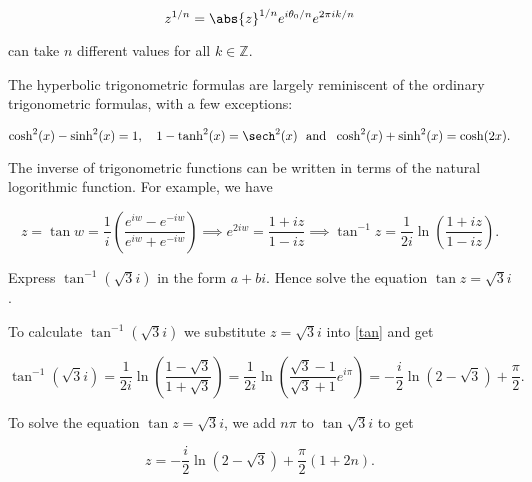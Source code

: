 \documentclass[english,a4paper,12pt]{report}
\begin{document}
\begin{equation}
    z^{1/n} = \abs{z}^{1/n} e^{i \theta _{0}/n } e^{2\pi i k /n}      
\end{equation}

can take \(n\) different values for all \(k \in \mathbb{Z}\). 

The hyperbolic trigonometric formulas are largely reminiscent of the ordinary trigonometric formulas, with a few exceptions:

\begin{equation}
    \cosh^2(x) - \sinh^2(x) = 1, \quad 1 - \tanh^2(x) = \sech^2(x) ~\text { and }~  \cosh^2(x) + \sinh^2(x) = \cosh(2x).
\end{equation}

The inverse of trigonometric functions can be written in terms of the natural logorithmic function. For example, we have

\begin{equation}
    z = \tan w = \frac{1}{i} \left( \frac{e^{iw} - e^{-iw} }{e^{iw} + e^{-iw}  }  \right) \implies e^{2iw} = \frac{1+iz}{1-iz}  \implies \tan ^{-1} z = \frac{1}{2i} \ln \left( \frac{1+iz}{1-iz}  \right). \label{tan} 
\end{equation}

{Express \(\tan ^{-1} {(\sqrt{3}i )} \) in the form \(a+bi\). Hence solve the equation \(\tan z = \sqrt{3} i\).}
{To calculate \(\tan ^{-1} {(\sqrt{3} i)}\) we substitute \(z = \sqrt{3}i \) into \cref{tan} and get

\begin{equation}
    \tan ^{-1} (\sqrt{3} i) = \frac{1}{2i} \ln (\frac{1-\sqrt{3} }{1+\sqrt{3} } ) = \frac{1}{2i} \ln \left( \frac{\sqrt{3}-1 }{\sqrt{3}+1 } e^{i\pi }  \right) = -\frac{i}{2} \ln (2-\sqrt{3} ) + \frac{\pi }{2}.    
\end{equation}

To solve the equation \(\tan z = \sqrt{3} i\), we add \(n\pi \) to \(\tan \sqrt{3}i \) to get 

\begin{equation}
    z = - \frac{i}{2} \ln (2-\sqrt{3} ) + \frac{\pi }{2} (1+ 2n).  
\end{equation}
 } 
\end{document}
